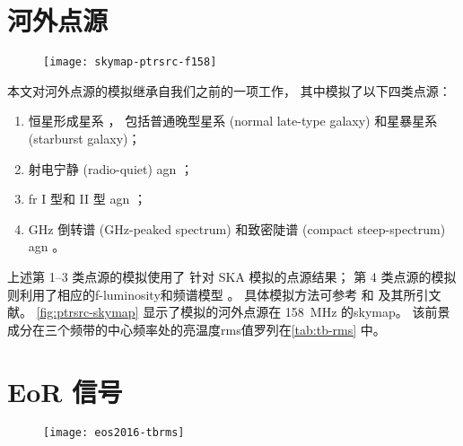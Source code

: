 \section{河外点源}
\label{sec:simu-eg-point}

\begin{figure}[htp]
  \centering
  \texttt{[image: skymap-ptrsrc-f158]}
  \label{fig:ptrsrc-skymap}
\end{figure}

本文对河外点源的模拟继承自我们之前的一项工作\cite{wang2010}，
其中模拟了以下四类点源：
\begin{enumerate}
  \item 恒星形成星系 \cite{condon1992}，
    包括普通晚型星系 (normal late-type galaxy) 和星暴星系 (starburst galaxy)；
  \item 射电宁静 (radio-quiet) \ac{agn} \cite{sandage1965,wilson1995}；
  \item \ac{fr} I 型和 II 型 \ac{agn} \cite{fanaroff1974}；
  \item GHz 倒转谱 (GHz-peaked spectrum)
    和致密陡谱 (compact steep-spectrum) \ac{agn} \cite{snellen2000}。
\end{enumerate}
上述第 1--3 类点源的模拟使用了  针对 SKA 模拟的点源结果；
第 4 类点源的模拟则利用了相应的\ac{f-luminosity}和频谱模型
\cite{oDea1998,snellen1998,fanti2001}。
具体模拟方法可参考  和  及其所引文献。
\autoref{fig:ptrsrc-skymap} 显示了模拟的河外点源在 \SI{158}{\MHz} 的\ac{skymap}。
该前景成分在三个频带的中心频率处的亮温度\ac{rms}值罗列在\autoref{tab:tb-rms} 中。


\section{EoR 信号}
\label{sec:simu-eor}

\begin{figure}[htp]
  \centering
  \texttt{[image: eos2016-tbrms]}
  \label{fig:eor-tbrms}
\end{figure}

